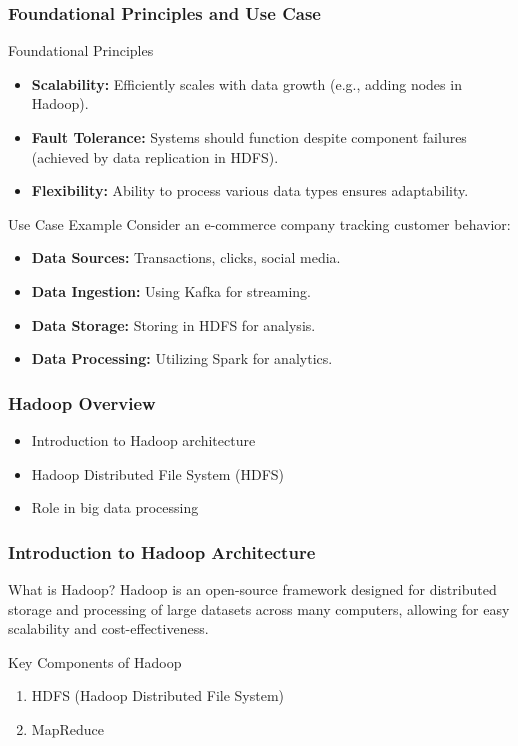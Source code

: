 \documentclass[aspectratio=169]{beamer}
\begin{document}
\begin{frame}[fragile]
    \frametitle{Foundational Principles and Use Case}
    \begin{block}{Foundational Principles}
        \begin{itemize}
            \item \textbf{Scalability:}  
            Efficiently scales with data growth (e.g., adding nodes in Hadoop).
            \item \textbf{Fault Tolerance:}  
            Systems should function despite component failures (achieved by data replication in HDFS).
            \item \textbf{Flexibility:}  
            Ability to process various data types ensures adaptability.
        \end{itemize}
    \end{block}
    
    \begin{block}{Use Case Example}
        Consider an e-commerce company tracking customer behavior:
        \begin{itemize}
            \item \textbf{Data Sources:} Transactions, clicks, social media.
            \item \textbf{Data Ingestion:} Using Kafka for streaming.
            \item \textbf{Data Storage:} Storing in HDFS for analysis.
            \item \textbf{Data Processing:} Utilizing Spark for analytics.
        \end{itemize}
    \end{block}
\end{frame}

\begin{frame}[fragile]
    \frametitle{Hadoop Overview}
    \begin{itemize}
        \item Introduction to Hadoop architecture
        \item Hadoop Distributed File System (HDFS)
        \item Role in big data processing
    \end{itemize}
\end{frame}

\begin{frame}[fragile]
    \frametitle{Introduction to Hadoop Architecture}
    \begin{block}{What is Hadoop?}
        Hadoop is an open-source framework designed for distributed storage and processing of large datasets across many computers, allowing for easy scalability and cost-effectiveness.
    \end{block}
    
    \begin{block}{Key Components of Hadoop}
        \begin{enumerate}
            \item HDFS (Hadoop Distributed File System)
            \item MapReduce
        \end{enumerate}
    \end{block}
\end{frame}
\end{document}
